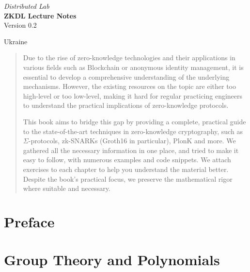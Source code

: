 \documentclass{zkdl-template-105x135-nohead}
\def\maketitle{
    \begin{center}
        \vspace{5mm}
        {\Large\sffamily \emph{Distributed Lab}} \\ \vspace{30mm}
        {\huge\sffamily\bfseries ZKDL Lecture Notes} \\ \vspace{5mm}
        {Version 0.2} \\ \vspace{10mm}
    \end{center}
    
    \vfill

    \begin{center}
        {Ukraine} \\ \vspace{2mm}
        {\sffamily \the\year}
    \end{center}

    \thispagestyle{empty}
    \pagebreak
}
\begin{document}
    \maketitle

    \pagecolor{white}
    
    \begin{abstract}
        \fontsize{7}{8}\selectfont
        Due to the rise of zero-knowledge technologies and their applications in
        various fields such as Blockchain or anonymous identity management, it is
        essential to develop a comprehensive understanding of the underlying
        mechanisms. However, the existing resources on the topic are either too
        high-level or too low-level, making it hard for regular practicing engineers
        to understand the practical implications of zero-knowledge protocols.
    
        This book aims to bridge this gap by providing a complete, practical guide
        to the state-of-the-art techniques in zero-knowledge cryptography, such as
        $\Sigma$-protocols, zk-SNARKs (Groth16 in particular), PlonK and more. We
        gathered all the necessary information in one place, and tried to make it
        easy to follow, with numerous examples and code snippets. We attach
        exercises to each chapter to help you understand the material better.
        Despite the book's practical focus, we preserve the mathematical rigor where
        suitable and necessary.
    \end{abstract}
    
    \thispagestyle{empty}
    \newpage

    \pagestyle{fancy}
    \pagecolor{white}

    \tableofcontents

    \pagebreak


    \section*{Preface}

    

    \section{Group Theory and Polynomials} \label{section:math-crypto-1}

    
\end{document}
